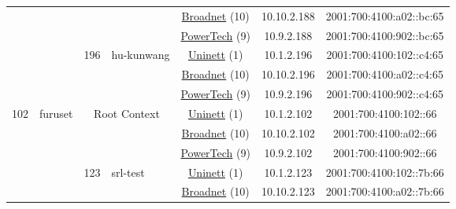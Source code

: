 \begin{small}
\begin{center}
\begin{longtable}{|c|c|c|c|c|c|c|c|}
  &  &  &  & \multicolumn{2}{|c|}{\tiny{\href{https://www.broadnet.no}{Broadnet} (10)}} & \tiny{10.10.2.188} & \tiny{2001:700:4100:a02::bc:65} \\* \cline{5-5}\cline{6-6}\cline{7-7}\cline{8-8}
  &  &  &  & \multicolumn{2}{|c|}{\tiny{\href{http://www.powertech.no}{PowerTech} (9)}} & \tiny{10.9.2.188} & \tiny{2001:700:4100:902::bc:65} \\* \cline{3-3}\cline{4-4}\cline{5-5}\cline{6-6}\cline{7-7}\cline{8-8}
  &  & \multirow{3}{*}{\tiny{196}} & \multicolumn{1}{|l|}{\multirow{3}{*}{\tiny{hu-kunwang}}} & \multicolumn{2}{|c|}{\tiny{\href{https://www.uninett.no}{Uninett} (1)}} & \tiny{10.1.2.196} & \tiny{2001:700:4100:102::c4:65} \\* \cline{5-5}\cline{6-6}\cline{7-7}\cline{8-8}
  &  &  &  & \multicolumn{2}{|c|}{\tiny{\href{https://www.broadnet.no}{Broadnet} (10)}} & \tiny{10.10.2.196} & \tiny{2001:700:4100:a02::c4:65} \\* \cline{5-5}\cline{6-6}\cline{7-7}\cline{8-8}
  &  &  &  & \multicolumn{2}{|c|}{\tiny{\href{http://www.powertech.no}{PowerTech} (9)}} & \tiny{10.9.2.196} & \tiny{2001:700:4100:902::c4:65} \\ \hline
 \multirow{42}{*}{\tiny{102}} & \multicolumn{1}{|l|}{\multirow{42}{*}{\tiny{furuset}}} & \multicolumn{2}{|c|}{\multirow{3}{*}{\tiny{Root Context}}} & \multicolumn{2}{|c|}{\tiny{\href{https://www.uninett.no}{Uninett} (1)}} & \tiny{10.1.2.102} & \tiny{2001:700:4100:102::66} \\* \cline{5-5}\cline{6-6}\cline{7-7}\cline{8-8}
  &  & \multicolumn{2}{|c|}{} & \multicolumn{2}{|c|}{\tiny{\href{https://www.broadnet.no}{Broadnet} (10)}} & \tiny{10.10.2.102} & \tiny{2001:700:4100:a02::66} \\* \cline{5-5}\cline{6-6}\cline{7-7}\cline{8-8}
  &  & \multicolumn{2}{|c|}{} & \multicolumn{2}{|c|}{\tiny{\href{http://www.powertech.no}{PowerTech} (9)}} & \tiny{10.9.2.102} & \tiny{2001:700:4100:902::66} \\* \cline{3-3}\cline{4-4}\cline{5-5}\cline{6-6}\cline{7-7}\cline{8-8}
  &  & \multirow{3}{*}{\tiny{123}} & \multicolumn{1}{|l|}{\multirow{3}{*}{\tiny{srl-test}}} & \multicolumn{2}{|c|}{\tiny{\href{https://www.uninett.no}{Uninett} (1)}} & \tiny{10.1.2.123} & \tiny{2001:700:4100:102::7b:66} \\* \cline{5-5}\cline{6-6}\cline{7-7}\cline{8-8}
  &  &  &  & \multicolumn{2}{|c|}{\tiny{\href{https://www.broadnet.no}{Broadnet} (10)}} & \tiny{10.10.2.123} & \tiny{2001:700:4100:a02::7b:66} \\* \cline{5-5}\cline{6-6}\cline{7-7}\cline{8-8}

\end{longtable}
\end{center}
\end{small}
